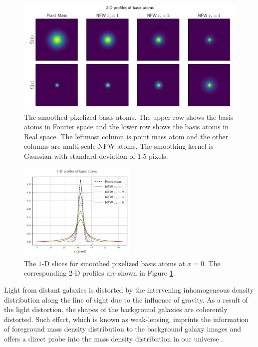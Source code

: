 \documentclass[twocolumn]{aastex62}
\begin{document}
\begin{figure}[!t]
    \includegraphics[width=1.\textwidth]{nfwlet-atom-2D.pdf}
    \caption{The smoothed pixelized basis atoms. The upper row shows the basis atoms in Fourier space
            and the lower row shows the basis atoms in Real space.
            The leftmost column is point mass atom and the other columns are multi-scale NFW atoms.
            The smoothing kernel is Gaussian with standard deviation of $1.5$ pixels.} \label{fig-atoms2D}
\end{figure}

\begin{figure}
 \includegraphics[width=0.5\textwidth]{nfwlet-atom-1D.pdf}
 \caption{The $1$-D slices for smoothed pixelized basis atoms at $x=0$. The corresponding $2$-D profiles are 
        shown in Figure \ref{fig-atoms2D}.} \label{fig-atoms1D}
\end{figure}

Light from distant galaxies is distorted by the intervening inhomogeneous density distribution along the line of sight
due to the influence of gravity. As a result of the light distortion, the shapes of the background galaxies are coherently
distorted. Such effect, which is known as weak-lensing, imprints the information of foreground mass density distribution
to the background galaxy images and offers a direct probe into the mass density distribution in our universe
\citep[see][for recent reviews]{revKilbinger15,revRachel17}.
\end{document}
